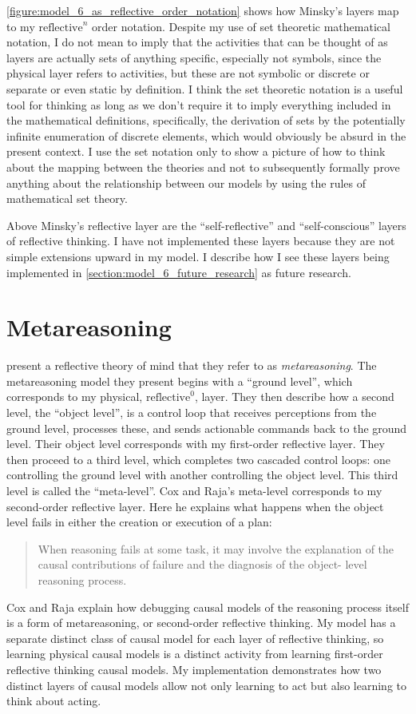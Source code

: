 \autoref{figure:model_6_as_reflective_order_notation} shows how
Minsky's layers map to my $\text{reflective}^n$ order notation.
Despite my use of set theoretic mathematical notation, I do not mean
to imply that the activities that can be thought of as layers are
actually sets of anything specific, especially not symbols, since the
physical layer refers to activities, but these are not symbolic or
discrete or separate or even static by definition.  I think the set
theoretic notation is a useful tool for thinking as long as we don't
require it to imply everything included in the mathematical
definitions, specifically, the derivation of sets by the potentially
infinite enumeration of discrete elements, which would obviously be
absurd in the present context.  I use the set notation only to show a
picture of how to think about the mapping between the theories and not
to subsequently formally prove anything about the relationship between
our models by using the rules of mathematical set theory.

Above Minsky's reflective layer are the ``self-reflective'' and
``self-conscious'' layers of reflective thinking.  I have not
implemented these layers because they are not simple extensions upward
in my model.  I describe how I see these layers being implemented in
\autoref{section:model_6_future_research} as future research.

\section{Metareasoning}

\cite{cox_and_raja:2008} present a reflective theory of mind that they
refer to as \emph{metareasoning}.  The metareasoning model they
present begins with a ``ground level'', which corresponds to my
physical, $\text{reflective}^0$, layer.  They then describe how a
second level, the ``object level'', is a control loop that receives
perceptions from the ground level, processes these, and sends
actionable commands back to the ground level.  Their object level
corresponds with my first-order reflective layer.  They then proceed
to a third level, which completes two cascaded control loops: one
controlling the ground level with another controlling the object
level.  This third level is called the ``meta-level''.  Cox and Raja's
meta-level corresponds to my second-order reflective layer.  Here he
explains what happens when the object level fails in either the
creation or execution of a plan:
\begin{quote}
When reasoning fails at some task, it may involve the explanation of
the causal contributions of failure and the diagnosis of the object-
level reasoning process.
\end{quote}
Cox and Raja explain how debugging causal models of the reasoning
process itself is a form of metareasoning, or second-order reflective
thinking.  My model has a separate distinct class of causal model for
each layer of reflective thinking, so learning physical causal models
is a distinct activity from learning first-order reflective thinking
causal models.  My implementation demonstrates how two distinct layers
of causal models allow not only learning to act but also learning to
think about acting.

